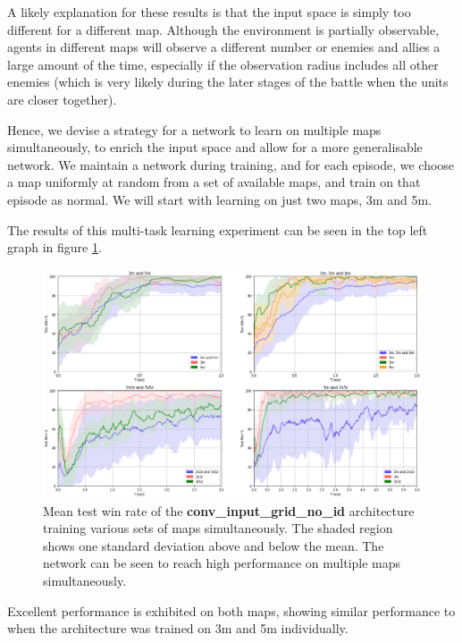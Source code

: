A likely explanation for these results is that the input space is simply too different for a different map. Although the environment is partially observable, agents in different maps will observe a different number or enemies and allies a large amount of the time, especially if the observation radius includes all other enemies (which is very likely during the later stages of the battle when the units are closer together). 

Hence, we devise a strategy for a network to learn on multiple maps simultaneously, to enrich the input space and allow for a more generalisable network. We maintain a network during training, and for each episode, we choose a map uniformly at random from a set of available maps, and train on that episode as normal. We will start with learning on just two maps, 3m and 5m.

The results of this multi-task learning experiment can be seen in the top left graph in figure \ref{fig:reptileall}. 




\begin{figure}[h]
    \centering
    \hbox{\hspace{-5em}\includegraphics[width=1.2\textwidth]{images/graphs/all.png}}
    \caption{Mean test win rate of the \textbf{conv\_input\_grid\_no\_id} architecture training various sets of maps simultaneously. The shaded region shows one standard deviation above and below the mean. The network can be seen to reach high performance on multiple maps simultaneously.}
    \label{fig:reptileall}
\end{figure}


Excellent performance is exhibited on both maps, showing similar performance to when the architecture was trained on 3m and 5m individually.  

